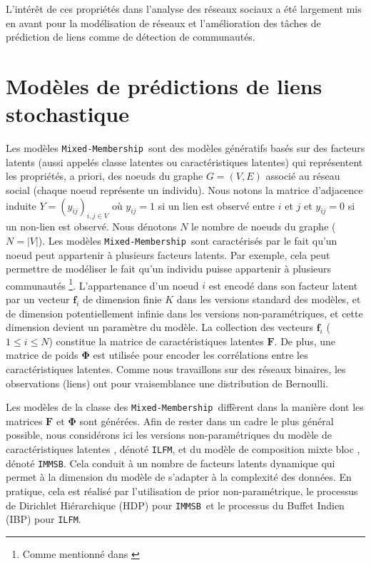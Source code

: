 \documentclass[french]{hermes-journal}
\newcommand{\ilfm}{\texttt{ILFM}}
\newcommand{\immsb}{\texttt{IMMSB}}
\newcommand{\mmm}{\texttt{Mixed-Membership}~}
\newcommand{\mat}[1]{\bm{#1}}
\begin{document}
L'intérêt de ces propriétés dans l'analyse des réseaux sociaux a été largement mis en avant pour la modélisation de réseaux et l'amélioration des tâches de prédiction de liens comme de détection de communautés.


\section{Modèles de prédictions de liens stochastique}

Les modèles \mmm sont des modèles génératifs basés sur des facteurs latents (aussi appelés classe latentes ou caractéristiques latentes) qui représentent les propriétés, a priori, des noeuds du graphe $G=(V,E)$ associé au réseau social (chaque noeud représente un individu). Nous notons la matrice d'adjacence induite $Y=(y_{ij})_{i,j\in V}$ où $y_{ij}=1$ si un lien est observé entre $i$ et $j$ et $y_{ij}=0$ si un non-lien est observé. Nous dénotons $N$ le nombre de noeuds du graphe ($N=|V|$). Les modèles \mmm sont caractérisés par le fait qu'un noeud peut appartenir à plusieurs facteurs latents. Par exemple, cela peut permettre de modéliser le fait qu'un individu puisse appartenir à plusieurs communautés \footnote{Comme mentionné dans \cite{goldenberg2010survey} }. L'appartenance d'un noeud $i$ est encodé dans son facteur latent par un vecteur $\mat{f}_i$ de dimension finie $K$ dans les versions standard des modèles, et de dimension potentiellement infinie dans les versions non-paramétriques, et cette dimension devient un paramètre du modèle. La collection des vecteurs $\mat{f}_{i}$ ($1 \le i \le N$) constitue la matrice de caractéristiques latentes $\mat{F}$. De plus, une matrice de poids $\mat{\Phi}$ est utilisée pour encoder les corrélations entre les caractéristiques latentes. Comme nous travaillons sur des réseaux binaires, les observations (liens) ont pour vraisemblance une distribution de Bernoulli.

Les modèles de la classe des \mmm diffèrent dans la manière dont les matrices $\mat{F}$ et $\mat{\Phi}$ sont générées. Afin de rester dans un cadre le plus général possible, nous considérons ici les versions non-paramétriques du modèle de caractéristiques latentes \cite{ILFRM}, dénoté \ilfm, et du modèle de composition mixte bloc  \cite{iMMSB,fan2015dynamic}, dénoté \immsb. Cela conduit à un nombre de facteurs latents dynamique qui permet à la dimension du modèle de s'adapter à la complexité des données. En pratique, cela est réalisé par l'utilisation de prior non-paramétrique, le processus de Dirichlet Hiérarchique (HDP) pour \immsb\ et le processus du Buffet Indien (IBP) pour \ilfm.~\\
\end{document}
